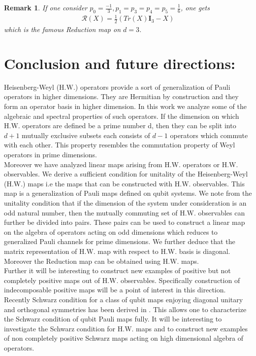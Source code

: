 \documentclass[12pt]{amsart}
\numberwithin{equation}{section}
\newtheorem{remark}{Remark}[section]
\begin{document}
\begin{remark}
    If one consider $p_0 = \frac{-1}{3}, p_1=p_3=p_4=p_5=\frac{1}{6}$, one gets 
    \begin{eqnarray*}
        \mathcal{R} (X)= \frac{1}{2} \left( Tr(X) \mathbf{I}_3 - X\right)
    \end{eqnarray*}
    which is the famous Reduction map on $d=3$.
\end{remark}
    

    

\vspace{1cm}


\section{Conclusion and future directions:} \label{V}
Heisenberg-Weyl (H.W.) operators provide a sort of generalization of Pauli operators in higher dimensions. They are Hermitian by construction and they form an operator basis in higher dimension. In this work we analyze some of the algebraic and spectral properties of such operators. If the dimension on which H.W. operators are defined be a prime number d, then they can be split into $d+1$ mutually exclusive subsets each consists of $d-1$ operators which commute with each other. This property resembles the commutation property of Weyl operators in prime dimensions.\\

Moreover we have analyzed linear maps arising from H.W. operators or H.W. observables. We derive a sufficient condition for unitality of the Heisenberg-Weyl (H.W.) maps i.e the maps that can be constructed with H.W. observables. This map is a generalization of Pauli maps defined on qubit systems. We note from the unitality condition that if the dimension of the system under consideration is an odd natural number, then the mutually commuting set of H.W. observables can further be divided into pairs. These pairs can be used to construct a linear map on the algebra of operators acting on odd dimensions which reduces to generalized Pauli channels for prime dimensions. We further deduce that the matrix representation of H.W. map with respect to H.W. basis is diagonal. Moreover the Reduction map can be obtained using H.W. maps.\\

Further it will be interesting to construct new examples of positive but not completely positive maps out of H.W. observables. Specifically construction of indecomposable positive maps will be a point of interest in this direction. Recently Schwarz condition for a class of qubit maps enjoying diagonal unitary and orthogonal symmetries has been derived in \cite{CB2024}. This allows one to characterize the Schwarz condition of qubit Pauli maps fully. It will be interesting to investigate the Schwarz condition for H.W. maps and to construct new examples of non completely positive Schwarz maps acting on high dimensional algebra of operators. 
\end{document}
